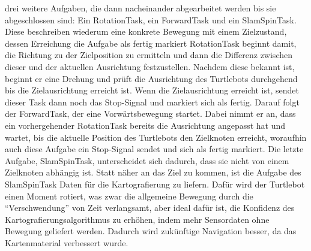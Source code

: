 drei weitere Aufgaben, die dann nacheinander abgearbeitet werden bis sie abgeschlossen sind: Ein RotationTask,
ein ForwardTask und ein SlamSpinTask.
Diese beschreiben wiederum eine konkrete Bewegung mit einem Zielzustand, dessen Erreichung die Aufgabe als fertig markiert
RotationTask beginnt damit, die Richtung zu der Zielposition zu ermitteln und dann die Differenz zwischen dieser und der
aktuellen Ausrichtung festzustellen.
Nachdem diese bekannt ist, beginnt er eine Drehung und prüft die Ausrichtung des Turtlebots durchgehend bis die
Zielausrichtung erreicht ist.
Wenn die Zielausrichtung erreicht ist, sendet dieser Task dann noch das Stop-Signal und markiert sich als fertig.
Darauf folgt der ForwardTask, der eine Vorwärtsbewegung startet.
Dabei nimmt er an, dass ein vorhergehender RotationTask bereits die Ausrichtung angepasst hat und wartet, bis die
aktuelle Position des Turtlebots den Zielknoten erreicht, woraufhin auch diese Aufgabe ein Stop-Signal sendet und sich
als fertig markiert.
Die letzte Aufgabe, SlamSpinTask, unterscheidet sich dadurch, dass sie nicht von einem Zielknoten abhängig ist.
Statt näher an das Ziel zu kommen, ist die Aufgabe des SlamSpinTask Daten für die Kartografierung zu liefern.
Dafür wird der Turtlebot einen Moment rotiert, was zwar die allgemeine Bewegung durch die ``Verschwendung'' von Zeit
verlangsamt, aber ideal dafür ist, die Konfidenz des Kartografierungsalgorithmus zu erhöhen, indem mehr Sensordaten ohne
Bewegung geliefert werden.
Dadurch wird zukünftige Navigation besser, da das Kartenmaterial verbessert wurde.

